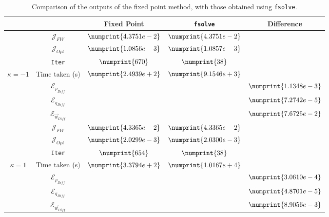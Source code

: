 \documentclass[11pt, a4paper]{article}
\theoremstyle{definition}
\newcommand{\adj}{q}
\begin{document}
\begin{table}
	\begin{tabular}{ | c | c || c | c | c ||}
		\hline
		\multicolumn{2}{|c||}{} & Fixed Point & \texttt{fsolve} & Difference   \\
		\hline
		\hline
		& $\mathcal{J}_{FW}$ & $\numprint{4.3751e-2}$ & $\numprint{4.3751e-2}$ &   \\
		& $\mathcal{J}_{Opt}$ & $\numprint{1.0856e-3}$ & $\numprint{1.0857e-3}$ &   \\
		& \texttt{Iter} & $\numprint{670}$ & $\numprint{38}$ &   \\
		$\kappa =-1$ & Time taken (s) & $\numprint{2.4939e+2}$ & $\numprint{9.1546e+3}$ &   \\
		& $\mathcal{E}_{\rho_{Diff}}$ & & &$\numprint{1.1348e-3}$  \\
		& $\mathcal{E}_{\adj_{Diff}}$ & & &$\numprint{7.2742e-5}$  \\
		& $\mathcal{E}_{\vec{w}_{Diff}} $& & & $\numprint{7.6725e-2}$  \\
		\hline
		& $\mathcal{J}_{FW}$ & $\numprint{4.3365e-2}$ & $\numprint{4.3365e-2}$ &   \\
		& $\mathcal{J}_{Opt}$ & $\numprint{2.0299e-3}$ & $\numprint{2.0300e-3}$ &   \\
		& \texttt{Iter} & $\numprint{654}$ & $\numprint{38}$ &   \\
		$\kappa =1$ & Time taken (s) & $\numprint{3.3794e+2}$ & $\numprint{1.0167e+4}$ &   \\
		& $\mathcal{E}_{\rho_{Diff}}$ & & &$\numprint{3.0610e-4}$  \\
		& $\mathcal{E}_{\adj_{Diff}}$ & & &$\numprint{4.8701e-5}$  \\
		& $\mathcal{E}_{\vec{w}_{Diff}} $& & & $\numprint{8.9056e-3}$  \\
		\hline
	\end{tabular}
	\caption{Comparison of the outputs of the fixed point method, with those obtained using \texttt{fsolve}.}
	\label{TabA3:Prob1}
	\end{table}
\end{document}
